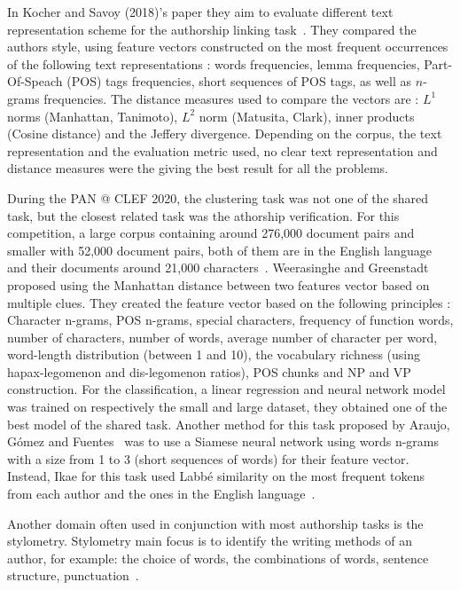 In Kocher and Savoy (2018)'s paper they aim to evaluate different text representation scheme for the authorship linking task~\cite{kocher_linking}.
They compared the authors style, using feature vectors constructed on the most frequent occurrences of the following text representations : words frequencies, lemma frequencies, Part-Of-Speach (POS) tags frequencies, short sequences of POS tags, as well as $n$-grams frequencies.
The distance measures used to compare the vectors are : $L^1$ norms (Manhattan, Tanimoto), $L^2$ norm (Matusita, Clark), inner products (Cosine distance) and the Jeffery divergence.
Depending on the corpus, the text representation and the evaluation metric used, no clear text representation and distance measures were the giving the best result for all the problems.

During the PAN @ CLEF 2020, the clustering task was not one of the shared task, but the closest related task was the athorship verification.
For this competition, a large corpus containing around 276,000 document pairs and smaller with 52,000 document pairs, both of them are in the English language and their documents around 21,000 characters~\cite{overview_pan20}.
Weerasinghe and Greenstadt~\cite{feature_vector_pan20} proposed using the Manhattan distance between two features vector based on multiple clues.
They created the feature vector based on the following principles : Character n-grams, POS n-grams, special characters, frequency of function words, number of characters, number of words, average number of character per word, word-length distribution (between 1 and 10), the vocabulary richness (using hapax-legomenon and dis-legomenon ratios), POS chunks and NP and VP construction.
For the classification, a linear regression and neural network model was trained on respectively the small and large dataset, they obtained one of the best  model of the shared task.
Another method for this task proposed by Araujo, Gómez and Fuentes~\cite{siamese_network_pan20} was to use a Siamese neural network using words n-grams with a size from 1 to 3 (short sequences of words) for their feature vector.
Instead, Ikae for this task used Labbé similarity on the most frequent tokens from each author and the ones in the English language~\cite{unine_pan20_verif}.

Another domain often used in conjunction with most authorship tasks is the stylometry.
Stylometry main focus is to identify the writing methods of an author, for example: the choice of words, the combinations of words, sentence structure, punctuation~\cite{savoy_stylo}.
